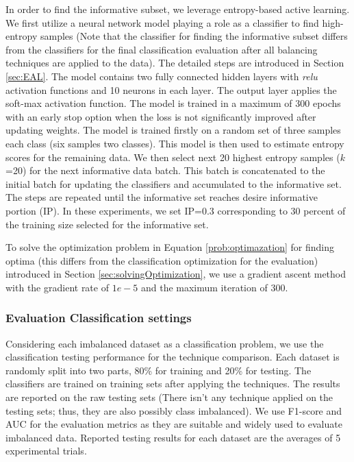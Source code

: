 In order to find the informative subset, we leverage entropy-based active learning. We first utilize a neural network model playing a role as a classifier to find high-entropy samples (Note that the classifier for finding the informative subset differs from the classifiers for the final classification evaluation after all balancing techniques are applied to the data). The detailed steps are introduced in Section \ref{sec:EAL}. The model contains two fully connected hidden layers with \textit{relu} activation functions and 10 neurons in each layer. The output layer applies the soft-max activation function. The model is trained in a maximum of 300 epochs with an early stop option when the loss is not significantly improved after updating weights. The model is trained firstly on a random set of three samples each class (six samples two classes). This model is then used to estimate entropy scores for the remaining data. We then select next 20  highest entropy samples ($k$=20) for the next informative data batch. This batch is concatenated to the initial batch for updating the classifiers and accumulated to the informative set. The steps are repeated until the informative set reaches desire informative portion (IP). In these experiments, we set IP=0.3 corresponding to 30 percent of the training size selected for the informative set. 


To solve the optimization problem in Equation \ref{prob:optimazation} for finding optima (this differs from the classification optimization for the evaluation) introduced in Section \ref{sec:solvingOptimization}, we use a gradient ascent method with the gradient rate of $1e-5$ and the maximum iteration of 300.   

\subsubsection{Evaluation Classification settings}
Considering each imbalanced dataset as a classification problem, we use the classification testing performance for the technique comparison. Each dataset is randomly split into two parts, 80\% for training and 20\% for testing. The classifiers are trained on training sets after applying the techniques. The results are reported on the raw testing sets (There isn't any technique applied on the testing sets; thus, they are also possibly class imbalanced). We use F1-score and AUC for the evaluation metrics as they are suitable and widely used to evaluate imbalanced data. Reported testing results for each dataset are the averages of 5 experimental trials.

